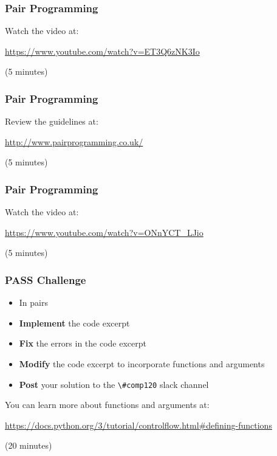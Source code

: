 \begin{frame}
	\frametitle{Pair Programming}
	
	Watch the video at:
	
	\vspace{1.5em}
		
	\url{https://www.youtube.com/watch?v=ET3Q6zNK3Io}
	
	\vspace{1em}
		
	(5 minutes)
	
\end{frame}

\begin{frame}
	\frametitle{Pair Programming}
	
	Review the guidelines at:
	
	\vspace{1.5em}
		
	\url{http://www.pairprogramming.co.uk/}
	
	\vspace{1em}
		
	(5 minutes)
	
\end{frame}

\begin{frame}
	\frametitle{Pair Programming}
	
	Watch the video at:
	
	\vspace{1.5em}
		
	\url{https://www.youtube.com/watch?v=ONnYCT_LJio}
	
	\vspace{1em}
		
	(5 minutes)
	
\end{frame}

\begin{frame}
	\frametitle{PASS Challenge}
	
	\begin{itemize}
		\item In pairs
		\item \textbf{Implement} the code excerpt
		\item \textbf{Fix} the errors in the code excerpt
		\item \textbf{Modify} the code excerpt to incorporate functions and arguments
		\item \textbf{Post} your solution to the \lstinline{\#comp120} slack channel
	\end{itemize}
	
	You can learn more about functions and arguments at:
	
	\vspace{1em}
	
	 \url{https://docs.python.org/3/tutorial/controlflow.html\#defining-functions}
	
	\vspace{1em}
	
	(20 minutes)
	
\end{frame}

